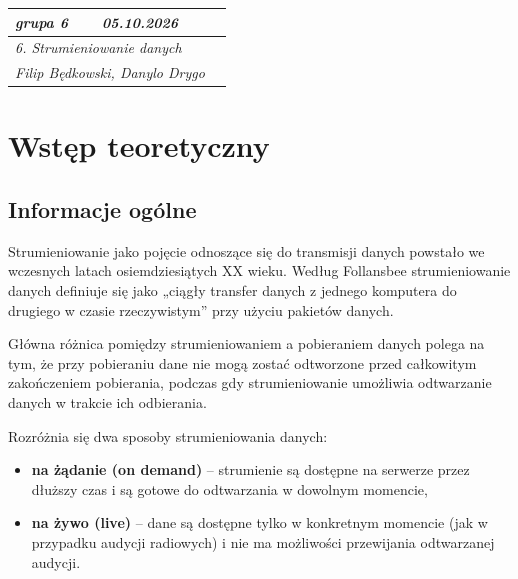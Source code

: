 \documentclass[11pt, a4paper]{article}
\begin{document}
\noindent
\begin{tabular}{|p{3cm}|p{7.5cm}|p{5.5cm}|}
\hline
\textit{grupa 6} & \textit{05.10.2026} & \textit{} \\[1.5em]
\hline
\multicolumn{3}{|l|}{\textit{6. Strumieniowanie danych}} \\[2.5em]
\hline
\multicolumn{2}{|l|}{\textit{Filip Będkowski, Danylo Drygo}} & \textit{} \\[2.5em]
\hline
\end{tabular}

\vspace{1em}

\section{Wstęp teoretyczny}

\subsection{Informacje ogólne}
Strumieniowanie jako pojęcie odnoszące się do transmisji danych powstało we wczesnych latach osiemdziesiątych XX wieku. Według Follansbee strumieniowanie danych definiuje się jako „ciągły transfer danych z jednego komputera do drugiego w czasie rzeczywistym” przy użyciu pakietów danych.

Główna różnica pomiędzy strumieniowaniem a pobieraniem danych polega na tym, że przy pobieraniu dane nie mogą zostać odtworzone przed całkowitym zakończeniem pobierania, podczas gdy strumieniowanie umożliwia odtwarzanie danych w trakcie ich odbierania.

Rozróżnia się dwa sposoby strumieniowania danych:
\begin{itemize}
    \item \textbf{na żądanie (on demand)} -- strumienie są dostępne na serwerze przez dłuższy czas i są gotowe do odtwarzania w dowolnym momencie,
    \item \textbf{na żywo (live)} -- dane są dostępne tylko w konkretnym momencie (jak w przypadku audycji radiowych) i nie ma możliwości przewijania odtwarzanej audycji.
\end{itemize}
\end{document}
